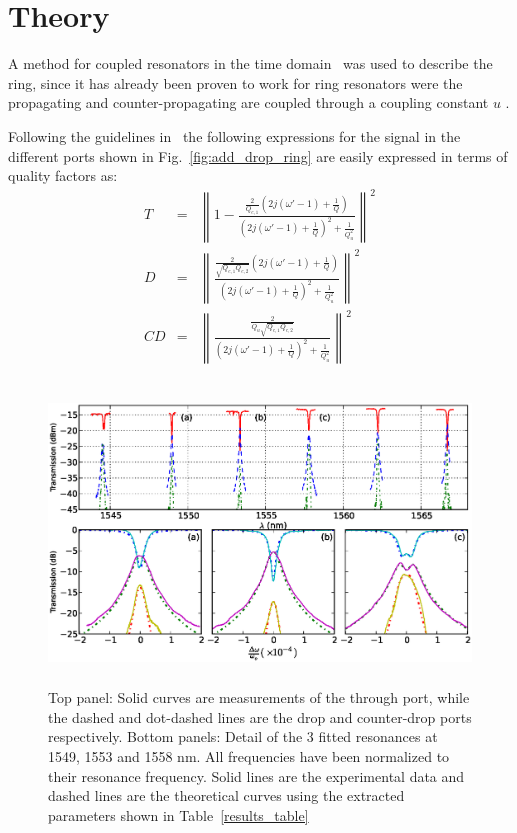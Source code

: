 \documentclass[conference,letterpaper,final]{IEEEtran}
\begin{document}
\section{Theory} 
\label{sec:theory}
A method for coupled resonators in the time domain~\cite{Haus84} was used to describe the ring, since it has already been proven to work for ring resonators were the propagating and counter-propagating are coupled through a coupling constant $u$ \cite{Zhang08}.


Following the guidelines in~\cite{Haus84,Zhang08,BLittle97-2} the following expressions for the signal in the different ports shown in Fig.~\ref{fig:add_drop_ring} are easily expressed in terms of quality factors as:
\begin{eqnarray}
	T&=& \left\lVert1-\frac{        \frac{2}{Q_{e,1}}(2j(\omega '-1)+\frac{1}{Q})   }  {   (2j(\omega '-1)+\frac{1}{Q})^2+\frac{1}{Q_u^2}  }\right\rVert^2 \label{eq:T} \\
	D &=& \left\lVert\frac{          \frac{2}{\sqrt{Q_{e,1}Q_{e,2}}}(2j(\omega '-1)+\frac{1}{Q})   }  {   (2j(\omega'-1)+\frac{1}{Q})^2+\frac{1}{Q_u^2}    }\right\rVert^2 \label{eq:D} \\
	CD&=& \left\lVert\frac{          \frac{2}{Q_u\sqrt{Q_{e,1}Q_{e,2}}}   }  {   (2j(\omega'-1)+\frac{1}{Q})^2+\frac{1}{Q_u^2}    }\right\rVert^2 \label{eq:CD}
\end{eqnarray}

\begin{figure}[!t]
    \centering
    \includegraphics[width=1.0\textwidth,height=8cm]{espectro_2.eps}
    \caption{Top panel: Solid curves are measurements of the through port, while the dashed and dot-dashed lines are the drop and counter-drop ports respectively. Bottom panels: Detail of the 3 fitted resonances at 1549, 1553 and 1558 nm. All frequencies have been normalized to their resonance frequency. Solid lines are the experimental data and dashed lines are the theoretical curves using the extracted parameters shown in Table~\ref{results_table}}
    \label{fig:espectro}
\end{figure}
\end{document}
